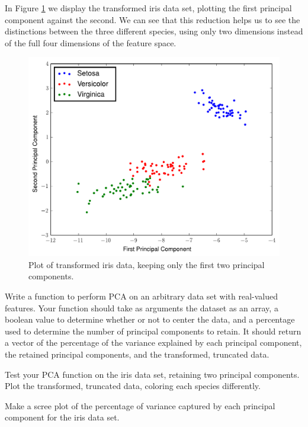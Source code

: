 In Figure \ref{fig:iris_pca} we display the transformed iris data set, plotting the first principal component against the second. We can see that this reduction helps us to see the distinctions between the three different species, using only two dimensions instead of the full four dimensions of the feature space.
\begin{figure}
\includegraphics[width=\textwidth]{iris_pca.pdf}
\caption{Plot of transformed iris data, keeping only the first two principal components.}
\label{fig:iris_pca}
\end{figure}

\begin{problem}
Write a function to perform PCA on an arbitrary data set with real-valued features. Your function should take as arguments the dataset as an array, a boolean value to determine whether or not to center the data, and a percentage used to determine the number of principal components to retain. It should return a vector of the percentage of the variance explained by each principal component, the retained principal components, and the transformed, truncated data.
\end{problem}

\begin{problem}
Test your PCA function on the iris data set, retaining two principal components. Plot the transformed, truncated data, coloring each species differently.
\end{problem}

\begin{problem}
Make a scree plot of the percentage of variance captured by each principal component for the iris data set.
\end{problem}